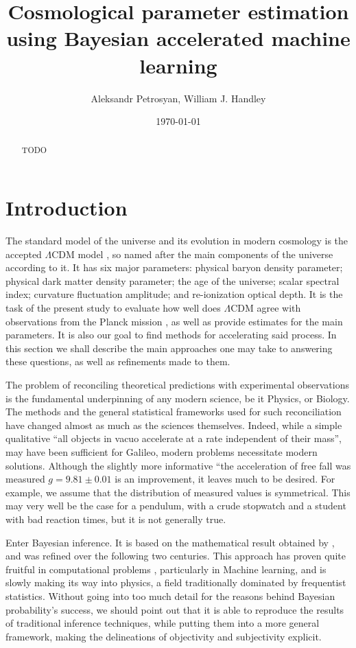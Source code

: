 \documentclass[usenatbib]{mnras}
\author{Aleksandr Petrosyan, William J. Handley}
\date{\today}
\title{Cosmological parameter estimation using Bayesian accelerated machine learning}
\begin{document}
\maketitle
\begin{abstract}
TODO
\end{abstract}

\section{Introduction}
\label{sec:org28f88e9}

The standard model of the universe and its evolution in modern
cosmology is the accepted \(\Lambda\)CDM model \citep{Condon2018},
so named after the main components of the universe according to
it. It has six major parameters: physical baryon density parameter;
physical dark matter density parameter; the age of the universe;
scalar spectral index; curvature fluctuation amplitude; and
re-ionization optical depth. It is the task of the present study to
evaluate how well does \(\Lambda\)CDM agree with observations from
the Planck mission \citep{planck}, as well as provide estimates for
the main parameters. It is also our goal to find methods for
accelerating said process. In this section we shall describe the
main approaches one may take to answering these questions, as well
as refinements made to them.

The problem of reconciling theoretical predictions with experimental
observations is the fundamental underpinning of any modern science,
be it Physics, or Biology. The methods and the general statistical
frameworks used for such reconciliation have changed almost as much
as the sciences themselves. Indeed, while a simple qualitative ``all
objects in vacuo accelerate at a rate independent of their mass'',
may have been sufficient for Galileo, modern problems necessitate
modern solutions. Although the slightly more informative ``the
acceleration of free fall was measured \(g = 9.81 \pm 0.01\) is an
improvement, it leaves much to be desired. For example, we assume
that the distribution of measured values is symmetrical. This may
very well be the case for a pendulum, with a crude stopwatch and a
student with bad reaction times, but it is not generally true.

Enter Bayesian inference. It is based on the mathematical result
obtained by \cite{1763}, and was refined over the
following two centuries. This approach has proven quite fruitful in
computational problems \citep{Wolpert2004}, particularly in Machine
learning, and is slowly making its way into physics, a field
traditionally dominated by frequentist statistics. Without going
into too much detail for the reasons behind Bayesian probability's
success, we should point out that it is able to reproduce the
results of traditional inference techniques, while putting them into
a more general framework, making the delineations of objectivity and
subjectivity explicit. 
\end{document}
